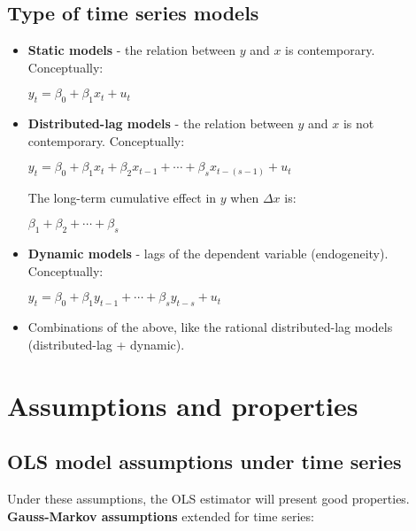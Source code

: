 \documentclass[10pt, a4paper, landscape]{article}
\begin{document}
\begin{multicols}{3}
\subsection*{Type of time series models}

\begin{itemize}[leftmargin=*]
	\item \textbf{Static models} - the relation between \( y \) and \( x \) is contemporary. Conceptually:
	\begin{center}
		\( y_{t} = \beta_{0} + \beta_{1} x_{t} + u_{t} \)
	\end{center}
	\item \textbf{Distributed-lag models} - the relation between \( y \) and \( x \) is not contemporary. Conceptually:
	\begin{center}
		\( y_{t} = \beta_{0} + \beta_{1} x_{t} + \beta_{2} x_{t - 1} + \cdots + \beta_{s} x_{t - (s - 1)} + u_{t} \)
	\end{center}
	The long-term cumulative effect in \( y \) when \( \Delta x \) is:
	\begin{center}
		\( \beta_{1} + \beta_{2} + \cdots + \beta_{s} \)
	\end{center}
	\item \textbf{Dynamic models} - lags of the dependent variable (endogeneity). Conceptually:
	\begin{center}
		\( y_{t} = \beta_{0} + \beta_{1} y_{t - 1} + \cdots + \beta_{s} y_{t - s} + u_{t} \)
	\end{center}
		\item Combinations of the above, like the rational distributed-lag models (distributed-lag + dynamic).
\end{itemize}

\columnbreak

\section*{Assumptions and properties}

\subsection*{OLS model assumptions under time series}

Under these assumptions, the OLS estimator will present good properties. \textbf{Gauss-Markov assumptions} extended for time series:


\end{multicols}
\end{document}
